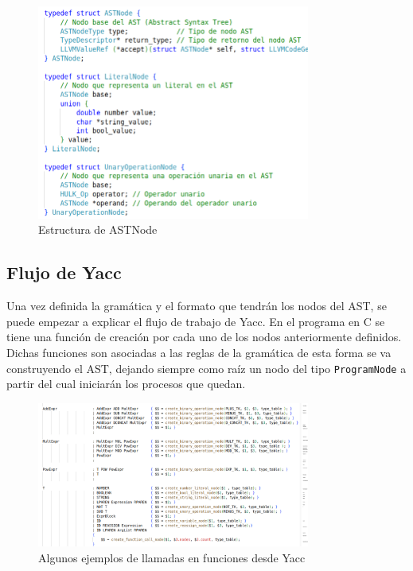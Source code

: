 \documentclass[11pt, a4paper, twoside]{article} %
\begin{document}
\begin{figure}[h!] 
    \centering
    \includegraphics[width=0.8\textwidth]{ASTNode.png}
    \caption{Estructura de ASTNode} 
\end{figure}

\subsection{Flujo de Yacc}
Una vez definida la gram\'atica y el formato que tendr\'an los nodos del AST, se puede empezar a explicar el flujo de trabajo de Yacc. En el programa 
en C se tiene una funci\'on de creaci\'on por cada uno de los nodos anteriormente definidos. Dichas funciones son asociadas a las reglas de la gram\'atica
de esta forma se va construyendo el AST, dejando siempre como ra\'iz un nodo del tipo \texttt{ProgramNode} a partir del cual iniciar\'an los procesos que quedan.

\begin{figure}[h!] 
    \centering 
    \includegraphics[width=0.8\textwidth]{CreacionAST.png}
    \caption{Algunos ejemplos de llamadas en funciones desde Yacc} 
\end{figure}
\end{document}
